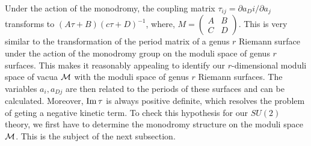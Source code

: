 Under the action of the monodromy, the coupling matrix $\tau_{ij}=
\partial a_Di/\partial a_j$ transforms to $(A\tau+B)(c\tau+D)^{-1}$,
where, $M=\left(\begin{array}{cc}A&B\\C&D\end{array}\right)$. This is
very similar to the transformation of the period matrix of a genus $r$
Riemann surface under the action of the monodromy group on the moduli
space of genus $r$ surfaces. This makes it reasonably appealing to
identify our $r$-dimensional moduli space of vacua ${\cal M}$ with the
moduli space of genus $r$ Riemann surfaces. The variables $a_i,a_{Dj}$
are then related to the periods of these surfaces and can be
calculated. Moreover, ${\rm Im}\,\tau$ is always positive definite,
which resolves the problem of geting a negative kinetic term. To check
this hypothesis for our $SU(2)$ theory, we first have to determine the
monodromy structure on the moduli space ${\cal M}$. This is the
subject of the next subsection.
